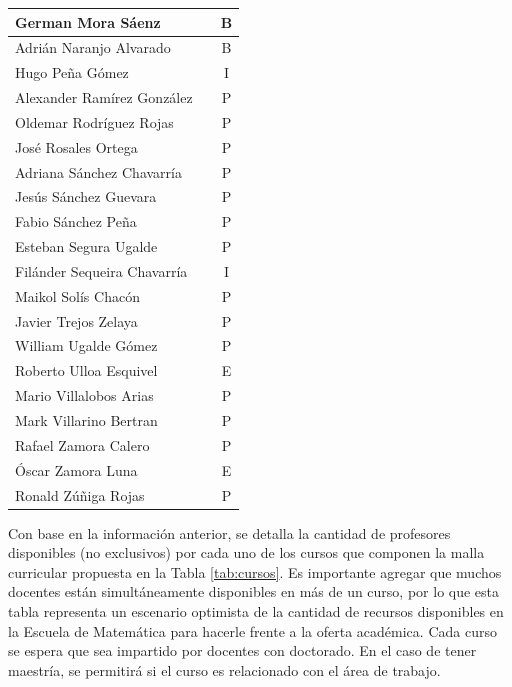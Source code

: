 \begin{longtable}[c]{|l|l|c|}
German Mora Sáenz &  & B \\ \hline
Adrián Naranjo Alvarado &  & B \\ \hline
Hugo Peña Gómez &  & I \\ \hline
Alexander Ramírez González &  & P \\ \hline
Oldemar Rodríguez Rojas &  & P \\ \hline
José Rosales Ortega &  & P \\ \hline
Adriana Sánchez Chavarría &  & P \\ \hline
Jesús Sánchez Guevara &  & P \\ \hline
Fabio Sánchez Peña &  & P \\ \hline
Esteban Segura Ugalde &  & P \\ \hline
Filánder Sequeira Chavarría &  & I \\ \hline
Maikol Solís Chacón &  & P \\ \hline
Javier Trejos Zelaya &  & P \\ \hline
William Ugalde Gómez &  & P \\ \hline
Roberto Ulloa Esquivel &  & E \\ \hline
Mario Villalobos Arias &  & P \\ \hline
Mark Villarino Bertran &  & P \\ \hline
Rafael Zamora Calero &  & P \\ \hline
Óscar Zamora Luna &  & E \\ \hline
Ronald Zúñiga Rojas &  & P \\ \hline
\end{longtable}


Con base en la información anterior, se detalla la cantidad de profesores disponibles (no exclusivos) por cada uno de los cursos que componen la malla curricular propuesta en la Tabla \ref{tab:cursos}. Es importante agregar que muchos docentes están simultáneamente disponibles en más de un curso, por lo que esta tabla representa un escenario optimista de la cantidad de recursos disponibles en la Escuela de Matemática para hacerle frente a la oferta académica. Cada curso se espera que sea impartido por docentes con doctorado. En el caso de tener maestría, se permitirá si el  curso es relacionado con el área de trabajo. %


